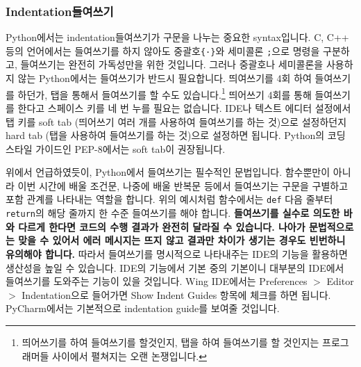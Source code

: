 \documentclass[../main.tex]{subfiles}
\begin{document}
\subsubsection{Indentation들여쓰기}
Python에서는 indentation들여쓰기가 구문을 나누는 중요한 syntax입니다.  C, C++
등의 언어에서는 들여쓰기를 하지 않아도 중괄호\verb|{·}|와
세미콜론 \verb|;|으로 명령을 구분하고, 들여쓰기는 완전히 가독성만을 위한
것입니다.  그러나 중괄호나 세미콜론을 사용하지 않는 Python에서는 들여쓰기가
반드시 필요합니다. 띄여쓰기를 4회 하여 들여쓰기를 하던가, 탭을 통해서 들여쓰기를
할 수도 있습니다.\footnote{띄어쓰기를 하여 들여쓰기를 할것인지, 탭을 하여
들여쓰기를 할 것인지는 프로그래머들 사이에서 펼쳐지는 오랜 논쟁입니다.}
띄어쓰기 4회를 통해 들여쓰기를 한다고 스페이스 키를 네 번 누를 필요는 없습니다.
IDE나 텍스트 에디터 설정에서 탭 키를 soft tab (띄어쓰기 여러 개를 사용하여
들여쓰기를 하는 것)으로 설정하던지 hard tab (탭을 사용하여 들여쓰기를 하는
것)으로 설정하면 됩니다.  Python의 코딩 스타일 가이드인 PEP-8에서는 soft tab이
권장됩니다.

위에서 언급하였듯이, Python에서 들여쓰기는 필수적인 문법입니다.  함수뿐만이
아니라 이번 시간에 배울 조건문, 나중에 배울 반복문 등에서 들여쓰기는 구문을
구별하고 포함 관계를 나타내는 역할을 합니다.  위의 예시처럼 함수에서는
\texttt{def} 다음 줄부터 \texttt{return}의 해당 줄까지 한 수준 들여쓰기를 해야
합니다.  \textbf{들여쓰기를 실수로 의도한 바와 다르게 한다면 코드의 수행 결과가
  완전히 달라질 수 있습니다.  나아가 문법적으로는 맞을 수 있어서 에러 메시지는
뜨지 않고 결과만 차이가 생기는 경우도 빈번하니 유의해야 합니다.} 따라서
들여쓰기를 명시적으로 나타내주는 IDE의 기능을 활용하면 생산성을 높일 수
있습니다.  IDE의 기능에서 기본 중의 기본이니 대부분의 IDE에서 들여쓰기를
도와주는 기능이 있을 것입니다.  Wing IDE에서는 Preferences $>$ Editor $>$
Indentation으로 들어가면 Show Indent Guides 항목에 체크를 하면 됩니다.
PyCharm에서는 기본적으로 indentation guide를 보여줄 것입니다.
\end{document}

